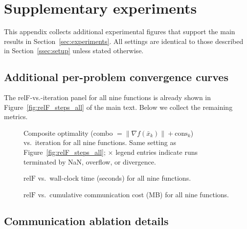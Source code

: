 \documentclass[review,onefignum,onetabnum]{siamart171218}
\begin{document}
	\section{Supplementary experiments}\label{app:supp_exp}
	
	This appendix collects additional experimental figures that
	support the main results in Section~\ref{sec:experiments}.
	All settings are identical to those described in
	Section~\ref{ssec:setup} unless stated otherwise.
	
	\subsection{Additional per-problem convergence curves}
	
	The relF-vs.-iteration panel for all nine functions is already shown
	in Figure~\ref{fig:relF_steps_all} of the main text.
	Below we collect the remaining metrics.
	
	\begin{figure}[htbp]
		\centering
		\caption{Composite optimality (combo $=\|\nabla f(\bar x_k)\|+\mathrm{cons}_k$)
			vs.\ iteration for all nine functions.
			Same setting as Figure~\ref{fig:relF_steps_all}; $\times$
			legend entries indicate runs terminated by NaN, overflow, or divergence.}
		\label{fig:app_combo_steps}
	\end{figure}
	
	\begin{figure}[htbp]
		\centering
		\caption{$\mathrm{relF}$ vs.\ wall-clock time (seconds) for all nine
			functions.}
		\label{fig:app_relF_time}
	\end{figure}
	
	\begin{figure}[htbp]
		\centering
		\caption{$\mathrm{relF}$ vs.\ cumulative communication cost (MB) for
			all nine functions.}
		\label{fig:app_relF_comm}
	\end{figure}
	
	\subsection{Communication ablation details}
	
\end{document}
